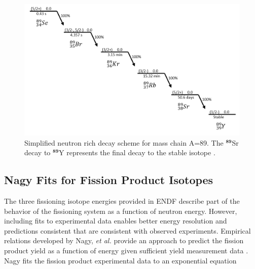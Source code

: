 \begin{figure}[htb!]
	\includegraphics[width=\linewidth]{Figures/Chapter2/89MassChain.png}
	\caption[Simplified neutron rich decay scheme for mass chain A=89. The $\mathrm{^{89}}$Sr decay to $\mathrm{^{89}}$Y represents the final decay to the stable isotope.]{Simplified neutron rich decay scheme for mass chain A=89. The $\mathbf{^{89}}$Sr decay to $\mathbf{^{89}}$Y represents the final decay to the stable isotope \cite{SINGH20131}.}
		\label{fig:89}	
\end{figure}



\subsection{Nagy Fits for Fission Product Isotopes}

The three fissioning isotope energies provided in ENDF describe part of the behavior of the fissioning system as a function of neutron energy.
However, including fits to experimental data enables better energy resolution and predictions consistent that are consistent with observed experiments.  
Empirical relations developed by Nagy, \textit{et al.} provide an approach to predict the fission product yield as a function of energy given sufficient yield measurement data \cite{Nagy1978}.
Nagy fits the fission product experimental data to an exponential equation 

